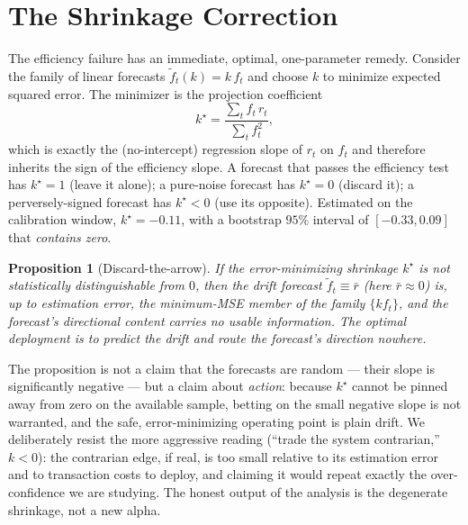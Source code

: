 \documentclass[10pt,twocolumn,twoside]{eec_style}
\newtheorem{proposition}{Proposition}
\begin{document}
\section{The Shrinkage Correction}
\label{sec:shrink}
The efficiency failure has an immediate, optimal, one-parameter remedy. Consider the
family of linear forecasts $\tilde f_t(k) = k\,f_t$ and choose $k$ to minimize expected
squared error. The minimizer is the projection coefficient
\begin{equation}
k^\star = \frac{\sum_t f_t\, r_t}{\sum_t f_t^{2}},
\label{eq:kstar}
\end{equation}
which is exactly the (no-intercept) regression slope of $r_t$ on $f_t$ and therefore
inherits the sign of the efficiency slope. A forecast that passes the efficiency test
has $k^\star=1$ (leave it alone); a pure-noise forecast has $k^\star=0$ (discard it);
a perversely-signed forecast has $k^\star<0$ (use its opposite). Estimated on the
calibration window, $k^\star = -0.11$, with a bootstrap $95\%$ interval of
$[-0.33,0.09]$ that \emph{contains zero}.

\begin{proposition}[Discard-the-arrow]
If the error-minimizing shrinkage $k^\star$ is not statistically distinguishable from
$0$, then the drift forecast $\tilde f_t\equiv \bar r$ (here $\bar r\approx 0$) is,
up to estimation error, the minimum-MSE member of the family $\{k f_t\}$, and the
forecast's directional content carries no usable information. The optimal deployment
is to predict the drift and route the forecast's direction nowhere.
\end{proposition}

\noindent The proposition is not a claim that the forecasts are random --- their slope
is significantly negative --- but a claim about \emph{action}: because $k^\star$ cannot be
pinned away from zero on the available sample, betting on the small negative slope is
not warranted, and the safe, error-minimizing operating point is plain drift. We
deliberately resist the more aggressive reading (``trade the system contrarian,''
$k<0$): the contrarian edge, if real, is too small relative to its estimation error and
to transaction costs to deploy, and claiming it would repeat exactly the
over-confidence we are studying. The honest output of the analysis is the degenerate
shrinkage, not a new alpha.

\end{document}
